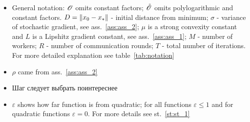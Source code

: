 \begin{table}[H]
\begin{adjustwidth}{-5cm}{-5cm}
\begin{threeparttable}
\begin{tabular}{|p{2cm}|p{1.7cm}|p{1.7cm}|p{1.5cm}|p{1.5cm}|p{6cm}|}
\end{tabular}
\begin{tablenotes}
\begin{itemize}
    \item General notation: 
    $\mathcal{O}$ omits constant factors;
    $\tilde{\mathcal{O}}$ omits polylogarithmic and constant factors.
    $D = \left\|x_0-x_*\right\|$ - initial distance from minimum;
    $\sigma$ - variance of stochastic gradient, see ass.~\ref{ass:ass_2}; 
    $\mu$ is a strong convexity constant 
    and $L$ is a Lipshitz gradient constant, see ass.~\ref{ass:ass_1};
    $M$ - number of workers;
    $R$ - number of communication rounds;
    $T$ - total number of iterations. For more detailed explanation see table~\ref{tab:notation}
    
    \item {} $\rho$ came from ass.~\ref{ass:ass_2}

    \item {} Шаг следует выбрать поинтереснее
    
    \item {} $\varepsilon$ shows how far function is from quadratic; 
    for all functions $\varepsilon \leq 1$ and for quadratic functions $\varepsilon = 0$. For more details see st.~\ref{st:st_1}
\end{itemize}
\end{tablenotes}
\end{threeparttable}

\end{adjustwidth} %

\label{tab:different_row_counts}

\end{table}
